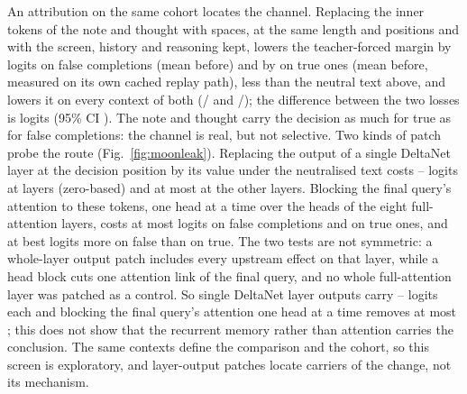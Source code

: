 An attribution on the same cohort locates the channel. Replacing the inner tokens of the note and thought with spaces, at the same length and positions and with the screen, history and reasoning kept, lowers the teacher-forced margin by \mlNeutralFs{} logits on false completions (mean \mlBaseFs{} before) and by \mlNeutralTrue{} on true ones (mean \mlBaseTrue{} before, measured on its own cached replay path), less than the neutral text above, and lowers it on every context of both (\mlNeutralFsPos/\mlFs{} and \mlNeutralTruePos/\mlTrue); the difference between the two losses is \mlNeutralSel{} logits (95\% CI \mlNeutralSelCi). The note and thought carry the decision as much for true as for false completions: the channel is real, but not selective. Two kinds of patch probe the route (Fig.~\ref{fig:moonleak}). Replacing the output of a single DeltaNet layer at the decision position by its value under the neutralised text costs \mlDeltaTopMin--\mlDeltaTopMax{} logits at layers \mlDeltaTopLayers{} (zero-based) and at most \mlDeltaRestMax{} at the other layers. Blocking the final query's attention to these tokens, one head at a time over the \mlHeads{} heads of the eight full-attention layers, costs at most \mlHeadMaxFs{} logits on false completions and \mlHeadMaxAny{} on true ones, and at best \mlBestHead{} logits more on false than on true. The two tests are not symmetric: a whole-layer output patch includes every upstream effect on that layer, while a head block cuts one attention link of the final query, and no whole full-attention layer was patched as a control. So single DeltaNet layer outputs carry \mlDeltaTopMin--\mlDeltaTopMax{} logits each and blocking the final query's attention one head at a time removes at most \mlHeadMaxAny; this does not show that the recurrent memory rather than attention carries the conclusion. The same contexts define the comparison and the cohort, so this screen is exploratory, and layer-output patches locate carriers of the change, not its mechanism. %




